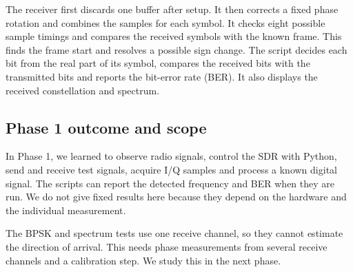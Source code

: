 The receiver first discards one buffer after setup. It then corrects a fixed
phase rotation and combines the samples for each symbol. It checks eight
possible sample timings and compares the received symbols with the known
frame. This finds the frame start and resolves a possible sign change. The
script decides each bit from the real part of its symbol, compares the
received bits with the transmitted bits and reports the bit-error rate (BER).
It also displays the received constellation and spectrum.

\subsection{Phase 1 outcome and scope}

In Phase 1, we learned to observe radio signals, control the SDR with Python,
send and receive test signals, acquire I/Q samples and process a known digital
signal. The scripts can report the detected frequency and BER when they are
run. We do not give fixed results here because they depend on the hardware and
the individual measurement.

The BPSK and spectrum tests use one receive channel, so they cannot estimate
the direction of arrival. This needs phase measurements from several receive
channels and a calibration step. We study this in the next phase.
